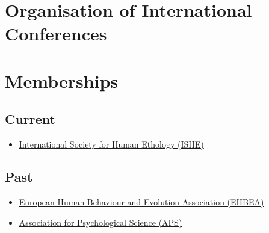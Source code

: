 \documentclass[11pt, a4paper]{awesome-cv}
\providecommand{\tightlist}{%
	\setlength{\itemsep}{0pt}\setlength{\parskip}{0pt}}
\begin{document}
\hypertarget{organisation-of-international-conferences}{%
\section{Organisation of International
Conferences}\label{organisation-of-international-conferences}}

\begin{cventries}
\end{cventries}

\hypertarget{memberships}{%
\section{Memberships}\label{memberships}}

\hypertarget{current}{%
\subsection{Current}\label{current}}

\begin{itemize}
\tightlist
\item
  \href{https://ishe.org/}{International Society for Human Ethology
  (ISHE)}
\end{itemize}

\hypertarget{past}{%
\subsection{Past}\label{past}}

\begin{itemize}
\tightlist
\item
  \href{https://www.cambridge.org/core/membership/ehbea}{European Human
  Behaviour and Evolution Association (EHBEA)}
\item
  \href{https://www.psychologicalscience.org/}{Association for
  Psychological Science (APS)}
\end{itemize}
\end{document}
